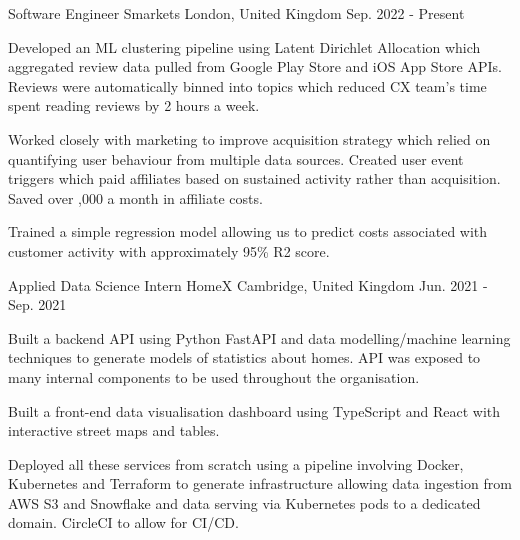 

\begin{cventries}

  \cventry
    {Software Engineer} %
    {Smarkets} %
    {London, United Kingdom} %
    {Sep. 2022 - Present} %
    {
      \begin{cvitems} %
        \item {Developed an ML clustering pipeline using Latent Dirichlet Allocation which aggregated review data pulled from Google Play Store and iOS App Store APIs. Reviews were automatically binned into topics which reduced CX team's time spent reading reviews by 2 hours a week.}
        \item {Worked closely with marketing to improve acquisition strategy which relied on quantifying user behaviour from multiple data sources. Created user event triggers which paid affiliates based on sustained activity rather than acquisition. Saved over ,000 a month in affiliate costs.}
        \item {Trained a simple regression model allowing us to predict costs associated with customer activity with approximately 95\% R2 score.}
      \end{cvitems}
    }

  \cventry
    {Applied Data Science Intern} %
    {HomeX} %
    {Cambridge, United Kingdom} %
    {Jun. 2021 - Sep. 2021} %
    {
      \begin{cvitems} %
        \item {Built a backend API using Python FastAPI and data modelling/machine learning techniques to generate models of statistics about homes. API was exposed to many internal components to be used throughout the organisation.}
        \item {Built a front-end data visualisation dashboard using TypeScript and React with interactive street maps and tables.}
        \item {Deployed all these services from scratch using a pipeline involving Docker, Kubernetes and Terraform to generate infrastructure allowing data ingestion from AWS S3 and Snowflake and data serving via Kubernetes pods to a dedicated domain. CircleCI to allow for CI/CD.}
      \end{cvitems}
    }


\end{cventries}

